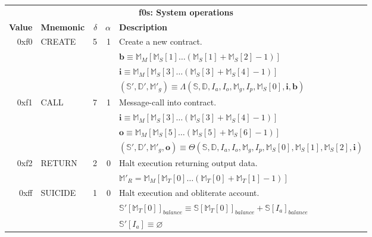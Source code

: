 \documentclass[9pt,oneside]{amsart}
\begin{document}
\begin{tabular*}{\columnwidth}[h]{rlrrl}
\toprule
\multicolumn{5}{c}{\textbf{f0s: System operations}} \vspace{5pt} \\
\textbf{Value} & \textbf{Mnemonic} & $\delta$ & $\alpha$ & \textbf{Description} \vspace{5pt} \\
0xf0 & {\small CREATE} & 5 & 1 & Create a new contract. \\
&&&& $\mathbf{b} \equiv \mathbb{M}_M[ \mathbb{M}_S[1] \dots (\mathbb{M}_S[1] + \mathbb{M}_S[2] - 1) ]$ \\
&&&& $\mathbf{i} \equiv \mathbb{M}_M[ \mathbb{M}_S[3] \dots (\mathbb{M}_S[3] + \mathbb{M}_S[4] - 1) ]$ \\
&&&& $(\mathbb{S}', \mathbb{D}', \mathbb{M}'_g) \equiv \Lambda(\mathbb{S}, \mathbb{D}, I_a, I_o, \mathbb{M}_g, I_p, \mathbb{M}_S[0], \mathbf{i}, \mathbf{b})$ \\
\midrule
0xf1 & {\small CALL} & 7 & 1 & Message-call into contract. \\
&&&& $\mathbf{i} \equiv \mathbb{M}_M[ \mathbb{M}_S[3] \dots (\mathbb{M}_S[3] + \mathbb{M}_S[4] - 1) ]$ \\
&&&& $\mathbf{o} \equiv \mathbb{M}_M[ \mathbb{M}_S[5] \dots (\mathbb{M}_S[5] + \mathbb{M}_S[6] - 1) ]$ \\
&&&& $(\mathbb{S}', \mathbb{D}', \mathbb{M}'_g, \mathbf{o}) \equiv \Theta(\mathbb{S}, \mathbb{D}, I_a, I_o, \mathbb{M}_g, I_p, \mathbb{M}_S[0], \mathbb{M}_S[1], \mathbb{M}_S[2], \mathbf{i})$ \\
\midrule
0xf2 & {\small RETURN} & 2 & 0 & Halt execution returning output data. \\
&&&& $\mathbb{M}'_R = \mathbb{M}_M[ \mathbb{M}_T[0] \dots ( \mathbb{M}_T[0] + \mathbb{M}_T[1] - 1 ) ]$ \\
\midrule
0xff & {\small SUICIDE} & 1 & 0 & Halt execution and obliterate account. \\
&&&& $\mathbb{S}'[\mathbb{M}_T[0]]_{balance} \equiv \mathbb{S}[\mathbb{M}_T[0]]_{balance} + \mathbb{S}[I_a]_{balance}$ \\
&&&& $\mathbb{S}'[I_a] \equiv \varnothing$ \\
\bottomrule
\end{tabular*}
\end{document}
